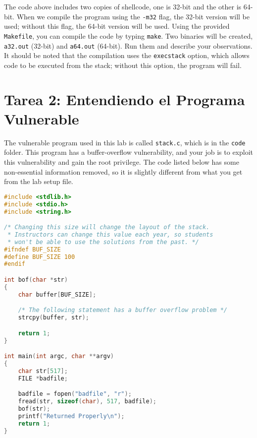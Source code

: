 The code above includes two copies of shellcode, one is 32-bit
and the other is 64-bit. When we compile the program using 
the \texttt{-m32} flag, the 32-bit version will be used; 
without this flag, the 64-bit version will be used. 
Using the provided \texttt{Makefile}, you can compile
the code by typing \texttt{make}. 
Two binaries will be created, \texttt{a32.out} (32-bit)
and \texttt{a64.out} (64-bit). 
Run them and describe your observations. 
It should be noted that the compilation
uses the \texttt{execstack} option, which allows 
code to be executed from the stack; 
without this option, the program will fail.



\section{Tarea 2: Entendiendo el Programa Vulnerable}
\label{sec:vulnerable_program}

The vulnerable program used in this lab is called 
\texttt{stack.c}, which is in the \texttt{code} folder. 
This program has a buffer-overflow vulnerability,
and your job is to exploit this vulnerability and gain the root privilege. 
The code listed below has some non-essential information removed, 
so it is slightly different from what you get from the lab setup file.


\begin{lstlisting}[language=C, caption={The vulnerable program (\texttt{stack.c})}]
#include <stdlib.h>
#include <stdio.h>
#include <string.h>

/* Changing this size will change the layout of the stack.
 * Instructors can change this value each year, so students
 * won't be able to use the solutions from the past. */
#ifndef BUF_SIZE
#define BUF_SIZE 100
#endif

int bof(char *str)
{
    char buffer[BUF_SIZE];

    /* The following statement has a buffer overflow problem */ 
    strcpy(buffer, str);          

    return 1;
}

int main(int argc, char **argv)
{
    char str[517];
    FILE *badfile;

    badfile = fopen("badfile", "r");
    fread(str, sizeof(char), 517, badfile);
    bof(str);
    printf("Returned Properly\n");
    return 1;
}
\end{lstlisting}

